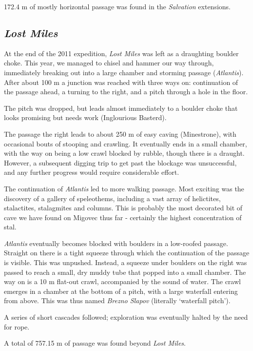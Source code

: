 172.4 m of mostly horizontal passage was found in the \emph{Salvation}
extensions.


\subsection{\texorpdfstring{\emph{Lost
Miles}}{Lost Miles}}

At the end of the 2011 expedition, \emph{Lost Miles} was left as a
draughting boulder choke. This year, we managed to chisel and hammer our
way through, immediately breaking out into a large chamber and storming
passage (\emph{Atlantis}). After about 100 m a junction was reached with
three ways on: continuation of the passage ahead, a turning to the
right, and a pitch through a hole in the floor.

The pitch was dropped, but leads almost immediately to a boulder choke
that looks promising but needs work (Inglourious Basterd).

The passage the right leads to about 250 m of easy caving (Minestrone),
with occasional bouts of stooping and crawling. It eventually ends in a
small chamber, with the way on being a low crawl blocked by rubble,
though there is a draught. However, a subsequent digging trip to get
past the blockage was unsuccessful, and any further progress would
require considerable effort.

The continuation of \emph{Atlantis} led to more walking passage. Most
exciting was the discovery of a gallery of speleothems, including a vast
array of helictites, stalactites, stalagmites and columns. This is
probably the most decorated bit of cave we have found on Migovec thus
far - certainly the highest concentration of stal.

\emph{Atlantis} eventually becomes blocked with boulders in a low-roofed
passage. Straight on there is a tight squeeze through which the
continuation of the passage is visible. This was unpushed. Instead, a
squeeze under boulders on the right was passed to reach a small, dry
muddy tube that popped into a small chamber. The way on is a 10 m
flat-out crawl, accompanied by the sound of water. The crawl emerges in
a chamber at the bottom of a pitch, with a large waterfall entering from
above. This was thus named \emph{Brezno Slapov} (literally `waterfall
pitch').

A series of short cascades followed; exploration was eventually halted
by the need for rope.

A total of 757.15 m of passage was found beyond \emph{Lost Miles}.


